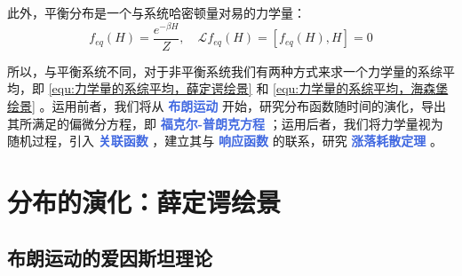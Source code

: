 此外，平衡分布是一个与系统哈密顿量对易的力学量：
\begin{equation}\label{equ:平衡分布和哈密顿量对易}
    f_{eq}(H) = \frac{e^{-\beta H}}{Z} ,\quad\mathcal{L}f_{eq}(H) = [f_{eq}(H), H] = 0
\end{equation}

所以，与平衡系统不同，对于非平衡系统我们有两种方式来求一个力学量的系综平均，即 \eqref{equ:力学量的系综平均，薛定谔绘景} 和 \eqref{equ:力学量的系综平均，海森堡绘景} 。运用前者，我们将从 \textcolor{RoyalBlue}{\textbf{\kaishu 布朗运动}} 开始，研究分布函数随时间的演化，导出其所满足的偏微分方程，即 \textcolor{RoyalBlue}{\textbf{\kaishu 福克尔-普朗克方程}} ；运用后者，我们将力学量视为随机过程，引入 \textcolor{RoyalBlue}{\textbf{\kaishu 关联函数}} ，建立其与 \textcolor{RoyalBlue}{\textbf{\kaishu 响应函数}} 的联系，研究 \textcolor{RoyalBlue}{\textbf{\kaishu 涨落耗散定理}} 。

\section{分布的演化：薛定谔绘景}\label{sec:分布的演化：薛定谔绘景}

\subsection{布朗运动的爱因斯坦理论}

